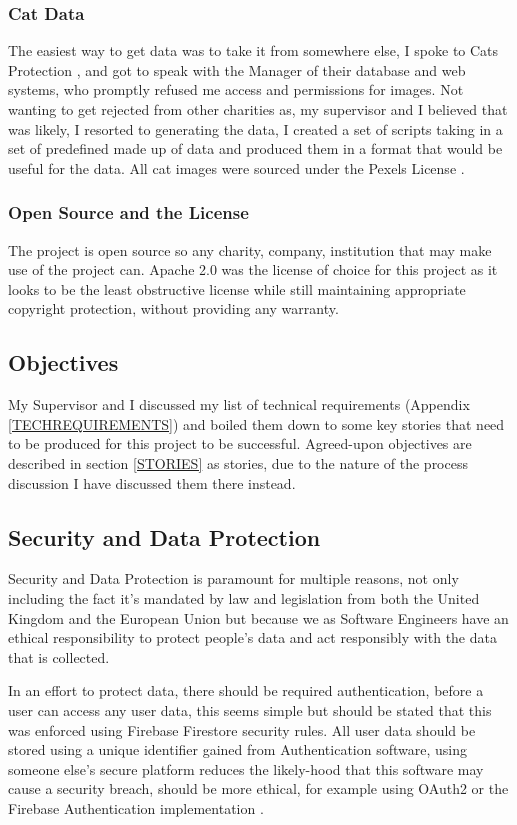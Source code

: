 \subsubsection{Cat Data}
The easiest way to get data was to take it from somewhere else, I spoke to Cats Protection \cite{CATSPROTECTION}, and got to speak with the Manager of their database and web systems, who promptly refused me access and permissions for images. Not wanting to get rejected from other charities as, my supervisor and I believed that was likely, I resorted to generating the data, I created a set of scripts taking in a set of predefined made up of data and produced them in a format that would be useful for the data. All cat images were sourced under the Pexels License \cite{PEXELSLICENSE}.

\subsubsection{Open Source and the License}
The project is open source so any charity, company, institution that may make use of the project can. Apache 2.0 \cite{APACHE2LICENSE} was the license of choice for this project as it looks to be the least obstructive license while still maintaining appropriate copyright protection, without providing any warranty.

\subsection{Objectives}
My Supervisor and I discussed my list of technical requirements (Appendix \ref{TECHREQUIREMENTS}) and boiled them down to some key stories that need to be produced for this project to be successful. Agreed-upon objectives are described in section \ref{STORIES} as stories, due to the nature of the process discussion I have discussed them there instead.

\subsection{Security and Data Protection} \label{DATAPROTECTION}
Security and Data Protection is paramount for multiple reasons, not only including the fact it's mandated by law and legislation from both the United Kingdom and the European Union but because we as Software Engineers have an ethical responsibility to protect people's data and act responsibly with the data that is collected.

In an effort to protect data, there should be required authentication, before a user can access any user data, this seems simple but should be stated that this was enforced using Firebase Firestore security rules. All user data should be stored using a unique identifier gained from Authentication software, using someone else's secure platform reduces the likely-hood that this software may cause a security breach, should be more ethical, for example using OAuth2 \cite{OAUTH} or the Firebase Authentication implementation \cite{FIREBASEAUTHENTICATION}.

